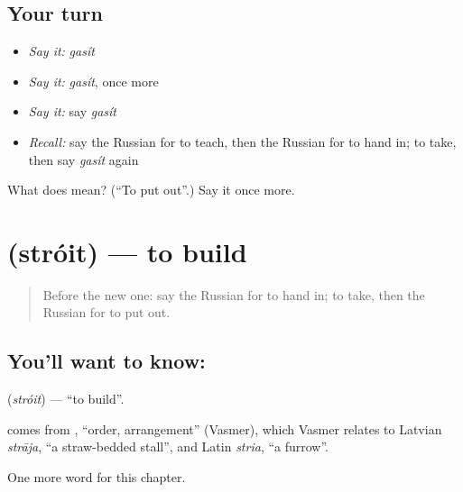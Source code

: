 \subsection*{Your turn}
\begin{itemize}
\raggedright
  \item \emph{Say it:} \emph{gasít}
  \item \emph{Say it:} \emph{gasít}, once more
  \item \emph{Say it:} say \emph{gasít}
  \item \emph{Recall:} say the Russian for to teach, then the Russian for to hand in; to take, then say \emph{gasít} again
\end{itemize}

\begin{tcolorbox}[breakable,colback=teal!4,colframe=teal!35!black,title={Before you move on}]
What does  mean? (\textquotedblleft{}To put out\textquotedblright{}.) Say it once more.
\end{tcolorbox}
\section[\texorpdfstring{\ru{строить} (stróit)}{строить (stróit)}]{ (stróit) — to build}

\label{lesson:RU-C206-stroit}



\begin{quote}
Before the new one: say the Russian for to hand in; to take, then the Russian for to put out.
\end{quote}

\subsection*{You'll want to know: }
\textbf{} (\emph{stróit}) — \textquotedblleft{}to build\textquotedblright{}.

\begin{cousinweb}
\textbf{} comes from \emph{}, \textquotedblleft{}order, arrangement\textquotedblright{} (Vasmer), which Vasmer relates to Latvian \emph{strāja}, \textquotedblleft{}a straw-bedded stall\textquotedblright{}, and Latin \emph{stria}, \textquotedblleft{}a furrow\textquotedblright{}.
\end{cousinweb}

\begin{grammarlens}[title={What you've built}]
One more word for this chapter.
\end{grammarlens}


